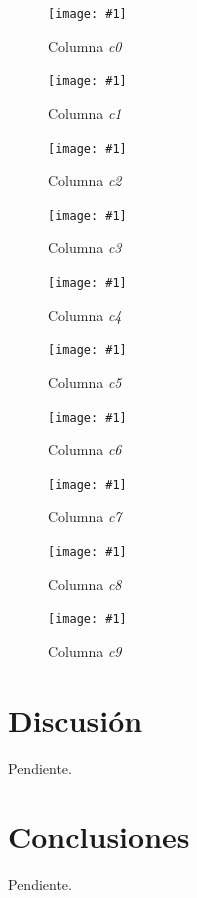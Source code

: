 \documentclass[a4paper, 10pt, twoside]{article}
\newcommand{\grafico}[3]{
  \begin{figure}[H]
    \texttt{[image: \#1]}
    \caption{#2}
    \label{#3}
  \end{figure}
}
\begin{document}
\grafico{dataset-c0}
        {Columna \emph{c0}}
        {dataset-columna-c0}

\grafico{dataset-c1}
        {Columna \emph{c1}}
        {dataset-columna-c1}

\grafico{dataset-c2}
        {Columna \emph{c2}}
        {dataset-columna-c2}

\grafico{dataset-c3}
        {Columna \emph{c3}}
        {dataset-columna-c3}

\grafico{dataset-c4}
        {Columna \emph{c4}}
        {dataset-columna-c4}

\grafico{dataset-c5}
        {Columna \emph{c5}}
        {dataset-columna-c5}

\grafico{dataset-c6}
        {Columna \emph{c6}}
        {dataset-columna-c6}

\grafico{dataset-c7}
        {Columna \emph{c7}}
        {dataset-columna-c7}

\grafico{dataset-c8}
        {Columna \emph{c8}}
        {dataset-columna-c8}

\grafico{dataset-c9}
        {Columna \emph{c9}}
        {dataset-columna-c9}




\section{Discusión}

Pendiente.




\section{Conclusiones}

Pendiente.
\end{document}
